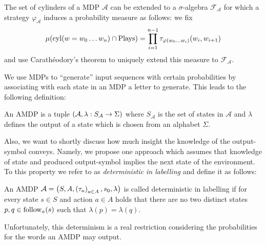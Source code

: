 The set of cylinders of a \ac{MDP} $\mathcal{A}$ can be extended to a
$\sigma$-algebra $\mathcal{F}_{\mathcal{A}}$ for which a strategy
$\varphi_{\mathcal{A}}$ induces a probability measure as follows: we fix
\begin{equation}
\mu(\operatorname{cyl}(w = w_{0}\dots w_{n})\cap\operatorname{Plays}) = 
\prod_{i=1}^{n-1}\tau_{\varphi(w_{0}\dots w_{i})}(w_{i}, w_{i+1})
\end{equation}
and use Carath\'eodory's theorem to uniquely extend this measure to
$\mathcal{F}_{\mathcal{A}}$.

We use \acp{MDP} to \enquote{generate} input sequences with certain
probabilities by associating with each state in an \ac{MDP} a letter to
generate. This leads to the following definition:
\begin{definition}
 An \acl{AMDP} is a tuple
 $\left(\mathcal{A}, \lambda: S_{\mathcal{A}}\rightarrow \Sigma\right)$
 where $S_{\mathcal{A}}$ is the set of states in $\mathcal{A}$ and $\lambda$
 defines the output of a state which is chosen from an alphabet $\Sigma$.
\end{definition}
Also, we want to shortly discuss how much insight the knowledge of the
output-symbol conveys. Namely, we propose one approach which assumes that
knowledge of state and produced output-symbol implies the next state of the
environment. To this property we refer to as \emph{deterministic in labelling}
and define it as follows:
\begin{definition}
  An \ac{AMDP} $\mathcal{A} = \left(S, A, \left(\tau_{a}\right)_{a\in A}, s_{0},
  \lambda\right)$ is called deterministic in labelling if for every state $s\in S$
  and action $a\in A$ holds that there are no two distinct states
  $p, q\in\operatorname{follow}_{a}(s)$ such that $\lambda(p) = \lambda(q)$.
\end{definition}
Unfortunately, this determinism is a real restriction considering the
probabilities for the words an \ac{AMDP} may output. 
